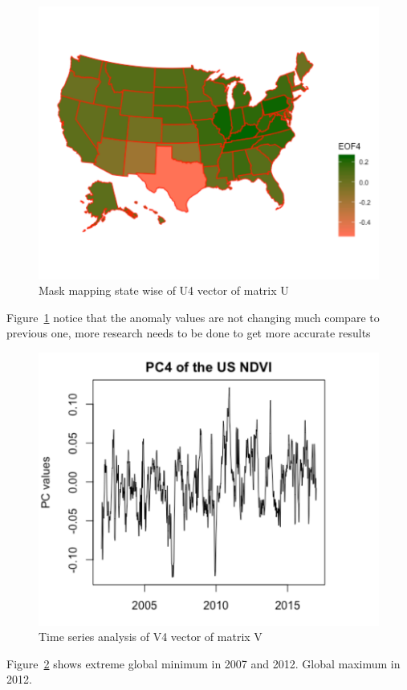     
     \begin{figure}[H]
            \centering
            \includegraphics[width=0.70\linewidth]{figures/ch5/SVD/eof4.png}
            \caption{\label{fig:EOF_4} Mask mapping state wise of U4 vector of matrix U}
    \end{figure}
    
    Figure~\ref{fig:EOF_4} notice that the anomaly values are not changing much compare to previous one, more research needs to be done to get more accurate results
    
     \begin{figure}[H]
            \centering
            \includegraphics[width=0.70\linewidth]{figures/ch5/SVD/pc4.png}
            \caption{\label{fig:V_4} Time series analysis of V4 vector of matrix V}
    \end{figure}
    
    Figure~\ref{fig:V_4} shows extreme global minimum in 2007 and 2012. Global maximum in 2012. 


